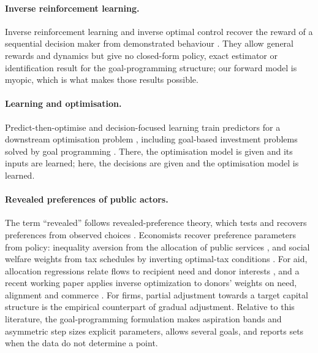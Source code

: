 \documentclass[pdflatex,sn-basic]{sn-jnl}
\theoremstyle{thmstyleone}\newtheorem{proposition}{Proposition}\newtheorem{theorem}{Theorem}
\theoremstyle{thmstylethree}\newtheorem{remark}{Remark}
\begin{document}
\paragraph{Inverse reinforcement learning.} Inverse reinforcement learning and inverse optimal control recover the reward of a sequential decision maker from demonstrated behaviour \citep{ng2000,ziebart2008}. They allow general rewards and dynamics but give no closed-form policy, exact estimator or identification result for the goal-programming structure; our forward model is myopic, which is what makes those results possible.

\paragraph{Learning and optimisation.} Predict-then-optimise and decision-focused learning train predictors for a downstream optimisation problem \citep{elmachtoub2022,hu2022,mandi2024}, including goal-based investment problems solved by goal programming \citep{bae2026}. There, the optimisation model is given and its inputs are learned; here, the decisions are given and the optimisation model is learned.

\paragraph{Revealed preferences of public actors.} The term ``revealed'' follows revealed-preference theory, which tests and recovers preferences from observed choices \citep{samuelson1938,afriat1967,varian1982}. Economists recover preference parameters from policy: inequality aversion from the allocation of public services \citep{behrman1987}, and social welfare weights from tax schedules by inverting optimal-tax conditions \citep{bourguignon2012,saez2016,hendren2020,lockwood2016}. For aid, allocation regressions relate flows to recipient need and donor interests \citep{alesina2000}, and a recent working paper applies inverse optimization to donors' weights on need, alignment and commerce \citep{karamifard2026}. For firms, partial adjustment towards a target capital structure \citep{flannery2006} is the empirical counterpart of gradual adjustment. Relative to this literature, the goal-programming formulation makes aspiration bands and asymmetric step sizes explicit parameters, allows several goals, and reports sets when the data do not determine a point.
\end{document}
